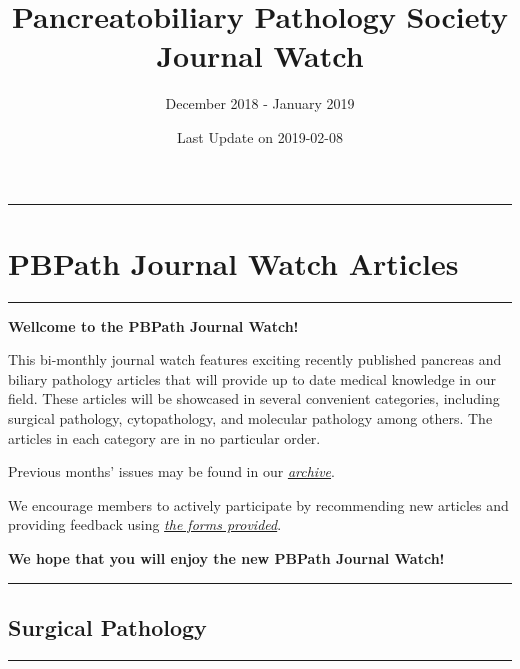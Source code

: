 \documentclass[]{article}
\title{Pancreatobiliary Pathology Society Journal Watch}
\subtitle{December 2018 - January 2019}
\author{}
\date{Last Update on 2019-02-08}
\begin{document}
\maketitle

{
\setcounter{tocdepth}{5}
\tableofcontents
}
\begin{center}\rule{0.5\linewidth}{\linethickness}\end{center}

\hypertarget{pbpath-journal-watch-articles}{%
\section{PBPath Journal Watch
Articles}\label{pbpath-journal-watch-articles}}

\begin{center}\rule{0.5\linewidth}{\linethickness}\end{center}

\textbf{Wellcome to the PBPath Journal Watch!}

This bi-monthly journal watch features exciting recently published
pancreas and biliary pathology articles that will provide up to date
medical knowledge in our field. These articles will be showcased in
several convenient categories, including surgical pathology,
cytopathology, and molecular pathology among others. The articles in
each category are in no particular order.

Previous months' issues may be found in our
\emph{\href{http://pbpath.org/journal-watch-archive/}{archive}}.

We encourage members to actively participate by recommending new
articles and providing feedback using
\emph{\href{https://docs.google.com/forms/d/e/1FAIpQLSeD3Z9J6Y7eMmiyM12f_SfAmHUlykb1zxZcwO6lg7cebGYQIQ/viewform}{the
forms provided}}.

\textbf{We hope that you will enjoy the new PBPath Journal Watch!}

\pagebreak

\begin{center}\rule{0.5\linewidth}{\linethickness}\end{center}

\hypertarget{surgical-pathology}{%
\subsection{Surgical Pathology}\label{surgical-pathology}}

\begin{center}\rule{0.5\linewidth}{\linethickness}\end{center}
\end{document}
